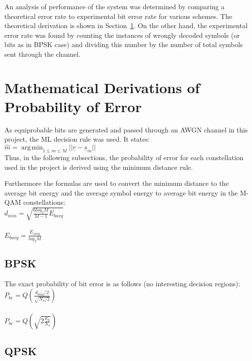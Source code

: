 \documentclass[]{article}
\DeclareMathOperator*{\argmin}{\arg\!\min}
\begin{document}
An analysis of performance of the system was determined by comparing a theoretical error rate to experimental bit error rate for various schemes.  The theoretical derivation is shown in Section~\ref{sec:deriv}. On the other hand, the experimental error rate was found by counting the instances of wrongly decoded symbols (or bits as in BPSK case) and dividing this number by the number of total symbols sent through the channel.  

\section{Mathematical Derivations of Probability of Error}
\label{sec:deriv}
As equiprobable bits are generated and passed through an AWGN channel in this project, the ML decision rule was used.  It states: \\

$\hat{m} = \argmin_{1\leq m \leq M}{||\underline{r} - \underline{s}_m||}$ 
\\

Thus, in the following subsections, the probability of error for each constellation used in the project is derived using the minimum distance rule.

Furthermore the formulas are used to convert the minimum distance to the average bit energy and the average symbol energy to average bit energy in the M-QAM constellations:\\

$d_{min} = \sqrt{\frac{6log_2M}{M-1}E_{bavg}} $\\ \\

$E_{bavg} = \frac{E_{savg}}{log_2M}$



\subsection{BPSK}
\label{sec:bpsk}
The exact probability of bit error is as follows (no interesting decision regions):\\

$ P_{be} = Q\left(\frac{d_{min}/2}{\sqrt{N_o/2}}\right) $ \\ \\

$ P_{be} = Q\left(\sqrt{2\frac{E_b}{N_o}}\right) $ \\

\subsection{QPSK}
\label{sec:qpsk}
\end{document}
